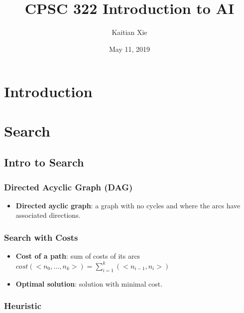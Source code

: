 \documentclass{article}
\title{CPSC 322 Introduction to AI}
\author{Kaitian Xie}
\date{May 11, 2019}
\begin{document}
\maketitle
\pagebreak

\section{Introduction}

\section{Search}

\subsection{Intro to Search}

\subsubsection{Directed Acyclic Graph (DAG)}

\begin{itemize}
    \item \textbf{Directed ayclic graph}: a graph with no cycles and where the arcs have associated directions.
\end{itemize}

\subsubsection{Search with Costs}

\begin{itemize}
    \item \textbf{Cost of a path}: sum of costs of its arcs $cost(<n_0, \ldots, n_k>) = \sum\limits_{i=1}^{k} (<n_{i-1}, n_i>)$
    \item \textbf{Optimal solution}: solution with minimal cost.
\end{itemize}

\subsubsection{Heuristic}
\end{document}
